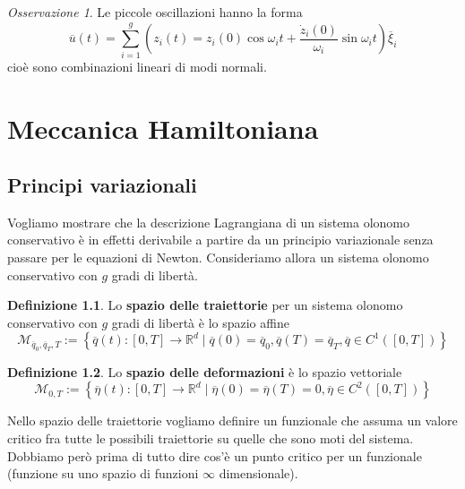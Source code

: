 \documentclass{book}
\theoremstyle{plain}
\theoremstyle{plain}
\theoremstyle{plain}
\theoremstyle{plain}
\theoremstyle{plain}
\theoremstyle{definition}
\newtheorem{defi}{Definizione}[chapter]
\theoremstyle{remark}
\newtheorem*{oss}{Osservazione}
\theoremstyle{definition}
\begin{document}
\begin{oss}
     Le piccole oscillazioni hanno la forma
     \begin{displaymath}
     \boxed{
         \overline{u}(t)=\sum_{i=1}^g\left(z_i(t)=z_i(0)\cos\omega_it+\frac{\dot{z}_i(0)}{\omega_i}\sin\omega_it\right)\overline{\xi}_i
         }
     \end{displaymath}
     cioè sono combinazioni lineari di modi normali.
\end{oss}

\chapter{Meccanica Hamiltoniana}

\section{Principi variazionali}

Vogliamo mostrare che la descrizione Lagrangiana di un sistema olonomo conservativo è in effetti derivabile a partire da un principio variazionale senza passare per le equazioni di Newton. Consideriamo allora un sistema olonomo conservativo con $g$ gradi di libertà.

\begin{defi}
    Lo \textbf{spazio delle traiettorie} per un sistema olonomo conservativo con $g$ gradi di libertà è lo spazio affine
    \begin{displaymath}
        \boxed{
        \mathcal{M}_{\overline{q}_0,\overline{q}_T,T}:=\left\{\overline{q}(t):[0,T]\to \mathbb{R}^d \; | \; \overline{q}(0)=\overline{q}_0, \overline{q}(T)= \overline{q}_T, \overline{q}\in C^1([0,T])\right\}
        }
    \end{displaymath}
\end{defi}

\begin{defi}
    Lo \textbf{spazio delle deformazioni} è lo spazio vettoriale
    \begin{displaymath}
    \boxed{
        \mathcal{M}_{0,T}:=\left\{\overline{\eta}(t):[0,T]\to \mathbb{R}^d \; |\; \overline{\eta}(0)=\overline{\eta}(T)=0, \overline{\eta}\in C^2([0,T])\right\}
        }
    \end{displaymath}
\end{defi}

\noindent Nello spazio delle traiettorie vogliamo definire un funzionale che assuma un valore critico fra tutte le possibili traiettorie su quelle che sono moti del sistema. Dobbiamo però prima di tutto dire cos'è un punto critico per un funzionale (funzione su uno spazio di funzioni $\infty$ dimensionale).
\end{document}
